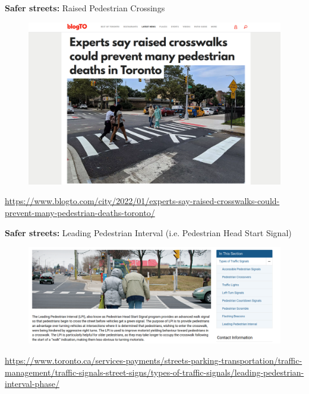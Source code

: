 \documentclass[aspectratio=169]{beamer}
\begin{document}
\begin{frame}
	
	\textbf{Safer streets:} Raised Pedestrian Crossings
	
	\begin{figure}
		\centering
		\includegraphics[width=0.8\linewidth]{images/raised_crossings.png}
	\end{figure}
	
	\tiny\url{https://www.blogto.com/city/2022/01/experts-say-raised-crosswalks-could-prevent-many-pedestrian-deaths-toronto/}
	
	
\end{frame}




\begin{frame}
	
	\textbf{Safer streets:} Leading Pedestrian Interval (i.e. Pedestrian Head Start Signal)
	
	\begin{figure}
		\centering
		\includegraphics[width=1\linewidth]{images/pedestrian_leading.png}
	\end{figure}
	
	\tiny\url{https://www.toronto.ca/services-payments/streets-parking-transportation/traffic-management/traffic-signals-street-signs/types-of-traffic-signals/leading-pedestrian-interval-phase/}
	
\end{frame}
\end{document}
